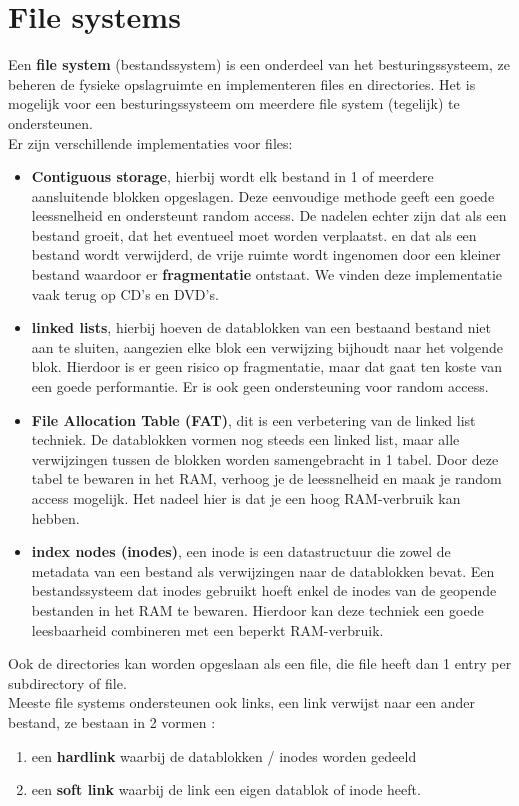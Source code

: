 \documentclass{report}
\begin{document}
   		\section{File systems}
   			Een \textbf{file system} (bestandssystem) is een onderdeel van het besturingssysteem, ze beheren de fysieke opslagruimte en implementeren files en directories. Het is mogelijk voor een besturingssysteem om meerdere file system (tegelijk) te ondersteunen. 
   			\\
   			Er zijn verschillende implementaties voor files: 
   			\begin{itemize}
   				\item \textbf{Contiguous storage}, hierbij wordt elk bestand in 1 of meerdere aansluitende blokken opgeslagen. Deze eenvoudige methode geeft een goede leessnelheid en ondersteunt random access. De nadelen echter zijn dat als een bestand groeit, dat het eventueel moet worden verplaatst. en dat als een bestand wordt verwijderd, de vrije ruimte wordt ingenomen door een kleiner bestand waardoor er \textbf{fragmentatie} ontstaat. We vinden deze implementatie vaak terug op CD's en DVD's. 
   				\item  \textbf{linked lists}, hierbij hoeven de datablokken van een bestaand bestand niet aan te sluiten, aangezien elke blok een verwijzing bijhoudt naar het volgende blok. Hierdoor is er geen risico op fragmentatie, maar dat gaat ten koste van een goede performantie. Er is ook geen ondersteuning voor random access. 
   				\item \textbf{File Allocation Table (FAT)}, dit is een verbetering van de linked list techniek. De datablokken vormen nog steeds een linked list, maar alle verwijzingen tussen de blokken worden samengebracht in 1 tabel. Door deze tabel te bewaren in het RAM, verhoog je de leessnelheid en maak je random access mogelijk. Het nadeel hier is dat je een hoog RAM-verbruik kan hebben.
   				\item \textbf{index nodes (inodes)}, een inode is een datastructuur die zowel de metadata van een bestand als verwijzingen naar de datablokken bevat. Een bestandssysteem dat inodes gebruikt hoeft enkel de inodes van de geopende bestanden in het RAM te bewaren. Hierdoor kan deze techniek een goede leesbaarheid combineren met een beperkt RAM-verbruik. 
   			\end{itemize}
   			Ook de directories kan worden opgeslaan als een file, die file heeft dan 1 entry per subdirectory of file.
   			\\
   			Meeste file systems ondersteunen ook links, een link verwijst naar een ander bestand, ze bestaan in 2 vormen : 
   			\begin{enumerate}
   				\item een \textbf{hardlink} waarbij de datablokken / inodes worden gedeeld
   				\item een \textbf{soft link} waarbij de link een eigen datablok of inode heeft. 
   			\end{enumerate}
\end{document}
